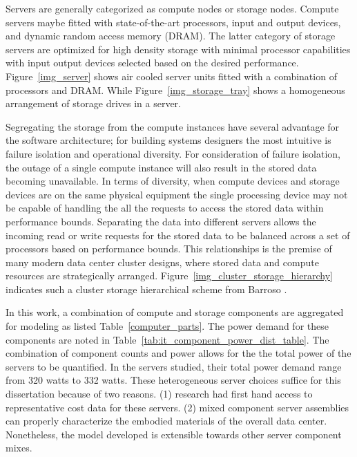             Servers are generally categorized as compute nodes or storage nodes. Compute servers maybe fitted with state-of-the-art processors, input and output devices, and dynamic random access memory (DRAM). The latter category of storage servers are optimized for high density storage with minimal processor capabilities with input output devices selected based on the desired performance. Figure~\ref{img_server} shows air cooled server units fitted with a combination of processors and DRAM. While Figure~\ref{img_storage_tray} shows a homogeneous arrangement of storage drives in a server. 
             
            
            
            Segregating the storage from the compute instances have several advantage for the software architecture; for building systems designers the most intuitive is failure isolation and operational diversity. For consideration of failure isolation, the outage of a single compute instance will also result in the stored data becoming unavailable. In terms of diversity, when compute devices and storage devices are on the same physical equipment the single processing device may not be capable of handling the all the requests to access the stored data within performance bounds. Separating the data into different servers allows the incoming read or write requests for the stored data to be balanced across a set of processors based on performance bounds. This relationships is the premise of many modern data center cluster designs, where stored data and compute resources are strategically arranged. Figure~\ref{img_cluster_storage_hierarchy} indicates such a cluster storage hierarchical scheme from Barroso \cite{barroso18}. 
            
            
            
            In this work, a combination of compute and storage components are aggregated for modeling as listed Table~\ref{computer_parts}. The power demand for these components are noted in Table~\ref{tab:it_component_power_dist_table}. The combination of component counts and power allows for the the total power of the servers to be quantified. In the servers studied, their total power demand range from 320 watts to 332 watts.  These heterogeneous server choices suffice for this dissertation because of two reasons. (1) research had first hand access to representative cost data for these servers. (2) mixed component server assemblies can properly characterize the embodied materials of the overall data center. Nonetheless, the model developed is extensible towards other server component mixes. 
             
            
